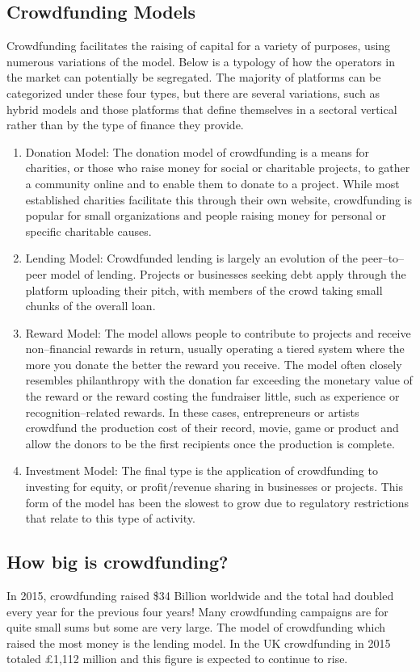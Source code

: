 \subsection*{ Crowdfunding Models}
Crowdfunding facilitates the raising of capital for a variety of purposes, using numerous variations of the model. Below is a typology of how the operators in the market can potentially be segregated. The majority of platforms can be categorized under these four types, but there are several variations, such as hybrid models and those platforms that define themselves in a sectoral vertical rather than by the type of finance they provide.
\begin{enumerate}
      \item Donation Model: 
            The donation model of crowdfunding is a means for charities, or those who raise money for social or charitable projects, to gather a community online and to enable them to donate to a project. While most established charities facilitate this through their own website, crowdfunding is popular for small organizations and people raising money for personal or specific charitable causes.
      \item Lending Model: 
            Crowdfunded lending is largely an evolution of the peer–to–peer model of lending. Projects or businesses seeking debt apply through the platform uploading their pitch, with members of the crowd taking small chunks of the overall loan.
      \item Reward Model: 
            The model allows people to contribute to projects and receive non–financial rewards in return, usually operating a tiered system where the more you donate the better the reward you receive. The model often closely resembles philanthropy with the donation far exceeding the monetary value of the reward or the reward costing the fundraiser little, such as experience or recognition–related rewards.
            In these cases, entrepreneurs or artists crowdfund the production cost of their record, movie, game or product and allow the donors to be the first recipients once the production is complete. 
      \item Investment Model: 
            The final type is the application of crowdfunding to investing for equity, or profit/revenue sharing in businesses or projects. This form of the model has been the slowest to grow due to regulatory restrictions that relate to this type of activity.
\end{enumerate}


\subsection*{ How big is crowdfunding? }
In 2015, crowdfunding raised \$34 Billion worldwide and the total had doubled every year for the previous four years! Many crowdfunding campaigns are for quite small sums but some are very large. The model of crowdfunding which raised the most money is the lending model. In the UK crowdfunding in 2015 totaled £1,112 million and this figure is expected to continue to rise.


